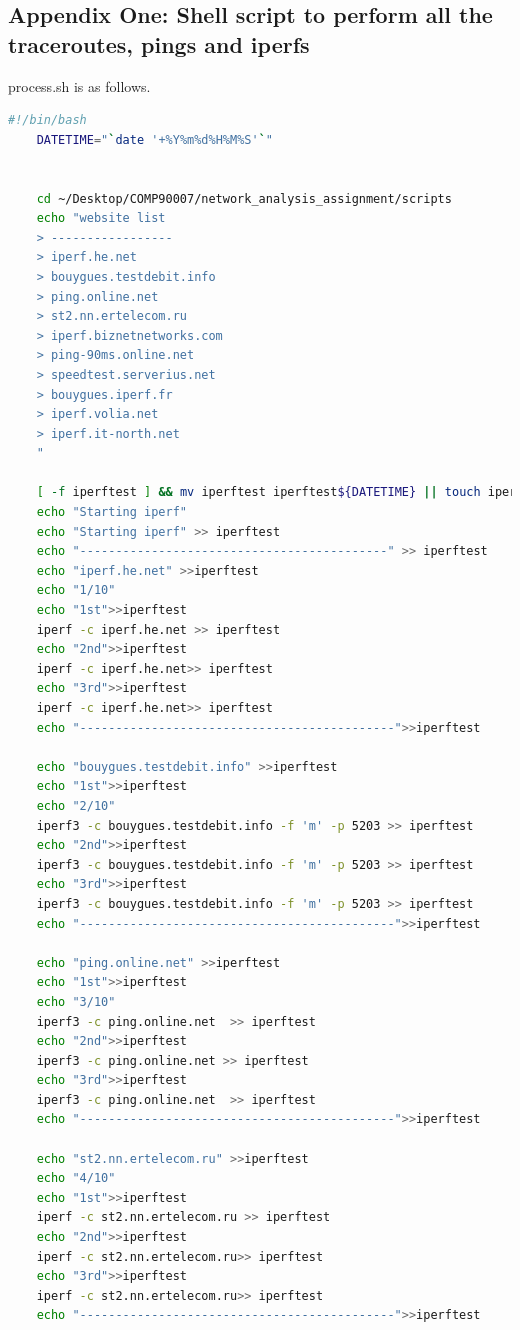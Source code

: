 \documentclass[paper=a4, fontsize=10pt]{scrartcl} %
\numberwithin{equation}{section} %
\numberwithin{figure}{section} %
\numberwithin{table}{section} %
\begin{document}
\subsection*{Appendix One: Shell script to perform all the traceroutes, pings and iperfs}
process.sh is as follows.
\begin{lstlisting}[language = bash]
    #!/bin/bash
    DATETIME="`date '+%Y%m%d%H%M%S'`" 
    
    
    cd ~/Desktop/COMP90007/network_analysis_assignment/scripts
    echo "website list
    > -----------------
    > iperf.he.net
    > bouygues.testdebit.info
    > ping.online.net
    > st2.nn.ertelecom.ru
    > iperf.biznetnetworks.com
    > ping-90ms.online.net
    > speedtest.serverius.net
    > bouygues.iperf.fr 
    > iperf.volia.net
    > iperf.it-north.net
    "
    
    [ -f iperftest ] && mv iperftest iperftest${DATETIME} || touch iperftest
    echo "Starting iperf"
    echo "Starting iperf" >> iperftest
    echo "-------------------------------------------" >> iperftest
    echo "iperf.he.net" >>iperftest
    echo "1/10"
    echo "1st">>iperftest
    iperf -c iperf.he.net >> iperftest
    echo "2nd">>iperftest
    iperf -c iperf.he.net>> iperftest
    echo "3rd">>iperftest
    iperf -c iperf.he.net>> iperftest
    echo "--------------------------------------------">>iperftest
    
    echo "bouygues.testdebit.info" >>iperftest
    echo "1st">>iperftest
    echo "2/10"
    iperf3 -c bouygues.testdebit.info -f 'm' -p 5203 >> iperftest
    echo "2nd">>iperftest
    iperf3 -c bouygues.testdebit.info -f 'm' -p 5203 >> iperftest
    echo "3rd">>iperftest
    iperf3 -c bouygues.testdebit.info -f 'm' -p 5203 >> iperftest
    echo "--------------------------------------------">>iperftest
    
    echo "ping.online.net" >>iperftest
    echo "1st">>iperftest
    echo "3/10"
    iperf3 -c ping.online.net  >> iperftest
    echo "2nd">>iperftest
    iperf3 -c ping.online.net >> iperftest
    echo "3rd">>iperftest
    iperf3 -c ping.online.net  >> iperftest
    echo "--------------------------------------------">>iperftest
    
    echo "st2.nn.ertelecom.ru" >>iperftest
    echo "4/10"
    echo "1st">>iperftest
    iperf -c st2.nn.ertelecom.ru >> iperftest
    echo "2nd">>iperftest
    iperf -c st2.nn.ertelecom.ru>> iperftest
    echo "3rd">>iperftest
    iperf -c st2.nn.ertelecom.ru>> iperftest
    echo "--------------------------------------------">>iperftest
    

\end{lstlisting}
\end{document}
